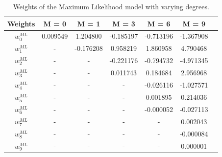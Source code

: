 \documentclass[12pt,twoside,a4paper]{article}
\begin{document}
\begin{table}[!htb]
\centering
\begin{tabular}{|c|c|c|c|c|c|c|}
\hline
\textbf{Weights}              & \textbf{M = 0} & \textbf{M = 1} & \textbf{M = 3} & \textbf{M = 6} & \textbf{M = 9} \\\hline
\textit{\textbf{$w_0^{ML}$}} & 0.009549       & 1.204800       & -0.185197      & -0.713196      & -1.367908      \\\hline
\textit{\textbf{$w_1^{ML}$}}  & -              & -0.176208      & 0.958219       & 1.860958       & 4.790468       \\\hline
\textit{\textbf{$w_2^{ML}$}} & - & - & -0.221176 & -0.794732 & -4.971345 \\\hline
\textit{\textbf{$w_3^{ML}$}} & - & - & 0.011743  & 0.184684  & 2.956968  \\\hline
\textit{\textbf{$w_4^{ML}$}} & - & - & -         & -0.026116 & -1.027571 \\\hline
\textit{\textbf{$w_5^{ML}$}} & - & - & -         & 0.001895  & 0.214036  \\\hline
\textit{\textbf{$w_6^{ML}$}} & - & - & -         & -0.000052 & -0.027113 \\\hline
\textit{\textbf{$w_7^{ML}$}} & - & - & -         & -         & 0.002043  \\\hline
\textit{\textbf{$w_8^{ML}$}} & - & - & -         & -         & -0.000084 \\\hline
\textit{\textbf{$w_9^{ML}$}} & - & - & -         & -         & 0.000001 \\\hline
\end{tabular}
\caption{Weights of the Maximum Likelihood model with varying degrees.}
\label{MLWEIGHTS}
\end{table}
\end{document}
